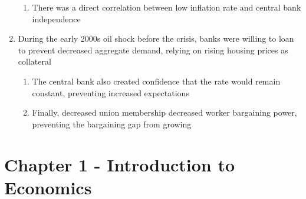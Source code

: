 \documentclass[11 pt, twoside]{article}
\begin{document}
\begin{enumerate}
\begin{enumerate}
\item There was a direct correlation between low inflation rate and central bank independence
\end{enumerate}
\item During the early 2000s oil shock before the crisis, banks were willing to loan to prevent decreased aggregate demand, relying on rising housing prices as collateral
\begin{enumerate}
\item The central bank also created confidence that the rate would remain constant, preventing increased expectations
\item Finally, decreased union membership decreased worker bargaining power, preventing the bargaining gap from growing
\end{enumerate}
\end{enumerate}

\section{Chapter 1 - Introduction to Economics}
\end{document}

